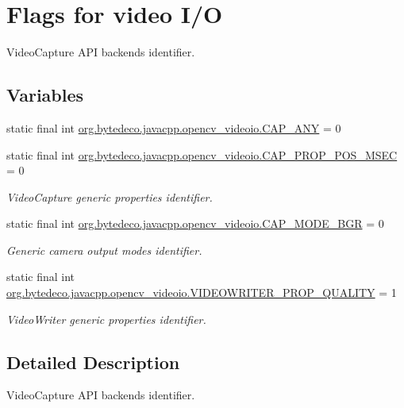 \hypertarget{group__videoio__flags__base}{}\section{Flags for video I/O}
\label{group__videoio__flags__base}


Video\+Capture A\+PI backends identifier.  


\subsection*{Variables}
\begin{DoxyCompactItemize}
\item 
static final int \hyperlink{group__videoio__flags__base_ga5919f622200581e7cc68b521cd528f3f}{org.\+bytedeco.\+javacpp.\+opencv\+\_\+videoio.\+C\+A\+P\+\_\+\+A\+NY} = 0
\item 
static final int \hyperlink{group__videoio__flags__base_ga0d261205f5852e23c0987e9a838e9f91}{org.\+bytedeco.\+javacpp.\+opencv\+\_\+videoio.\+C\+A\+P\+\_\+\+P\+R\+O\+P\+\_\+\+P\+O\+S\+\_\+\+M\+S\+EC} = 0
\begin{DoxyCompactList}\small\item\em Video\+Capture generic properties identifier. \end{DoxyCompactList}\item 
static final int \hyperlink{group__videoio__flags__base_gaadf3dff0251965990b45d02868b90b23}{org.\+bytedeco.\+javacpp.\+opencv\+\_\+videoio.\+C\+A\+P\+\_\+\+M\+O\+D\+E\+\_\+\+B\+GR} = 0
\begin{DoxyCompactList}\small\item\em Generic camera output modes identifier. \end{DoxyCompactList}\item 
static final int \hyperlink{group__videoio__flags__base_gac45c570604a0024fe45239139e0d4e5b}{org.\+bytedeco.\+javacpp.\+opencv\+\_\+videoio.\+V\+I\+D\+E\+O\+W\+R\+I\+T\+E\+R\+\_\+\+P\+R\+O\+P\+\_\+\+Q\+U\+A\+L\+I\+TY} = 1
\begin{DoxyCompactList}\small\item\em Video\+Writer generic properties identifier. \end{DoxyCompactList}\end{DoxyCompactItemize}


\subsection{Detailed Description}
Video\+Capture A\+PI backends identifier. 

